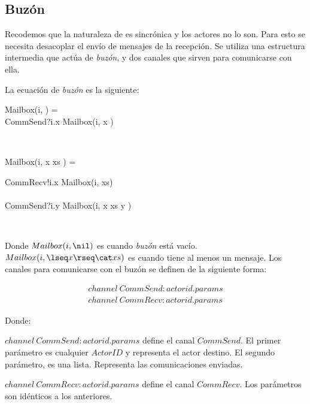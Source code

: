 \subsection{Buzón}\label{modelo:buzon}

Recodemos que la naturaleza de \CSP es sincrónica y los actores no lo son. Para esto se necesita desacoplar el envío de mensajes de la recepción. Se utiliza una estructura intermedia que actúa de \textit{buzón}, y dos canales que sirven para comunicarse con ella.

La ecuación de \textit{buzón} es la siguiente:

\begin{process}
\begin{block}
Mailbox(i, \nil) = {} \\ \quad
CommSend?i.x \then Mailbox(i, \lseq x \rseq) 
\end{block} \\

\begin{block}
Mailbox(i, \lseq x \rseq \cat xs ) = {} \\ \quad 
  \begin{block}
    CommRecv!i.x \then Mailbox(i, xs) \\
    \Extchoice \\
    CommSend?i.y \then Mailbox(i, \lseq x \rseq \cat xs \cat \lseq y \rseq ) 
  \end{block}
\end{block} \\

\end{process}

Donde $Mailbox(i, \nil)$ es cuando \textit{buzón} está vacío. $Mailbox(i, \lseq x \rseq \cat xs )$ es cuando tiene al menos un mensaje. Los canales para comunicarse con el buzón se definen de la siguiente forma:

\begin{align*}
channel\ CommSend:actorid.params \\
channel\ CommRecv:actorid.params
\end{align*}

Donde:
\begin{description}
 \item $channel\ CommSend:actorid.params$ define el canal $CommSend$. El primer parámetro es cualquier $ActorID$ y representa el actor destino. El segundo parámetro, es una lista. Representa las comunicaciones enviadas. 
 \item $channel\ CommRecv:actorid.params$ define el canal $CommRecv$. Los parámetros son idénticos a los anteriores.
\end{description}

